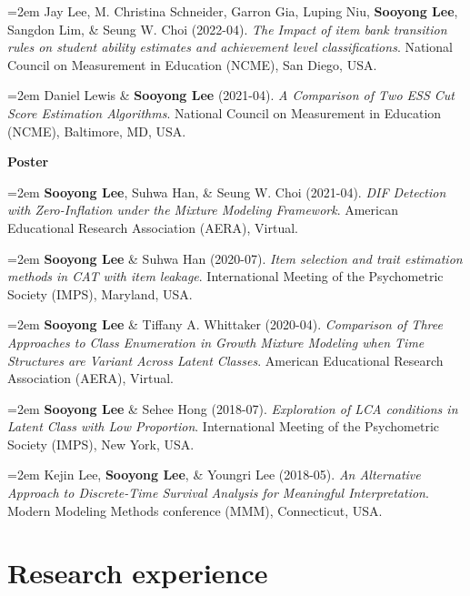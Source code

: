 \documentclass[11pt,letterpaper,]{awesome-me}
\begin{document}
\hangindent=2em  Jay Lee, M. Christina Schneider, Garron
Gia, Luping Niu, \textbf{Sooyong Lee}, Sangdon Lim, \& Seung W. Choi
(2022-04). \emph{The Impact of item bank transition rules on student
ability estimates and achievement level classifications}. National
Council on Measurement in Education (NCME), San Diego, USA.

\hangindent=2em  Daniel Lewis \& \textbf{Sooyong Lee}
(2021-04). \emph{A Comparison of Two ESS Cut Score Estimation
Algorithms}. National Council on Measurement in Education (NCME),
Baltimore, MD, USA.

\setlength{\leftskip}{0cm}

\textbf{Poster}

\setlength{\leftskip}{0.5cm}

\hangindent=2em  \textbf{Sooyong Lee}, Suhwa Han, \& Seung
W. Choi (2021-04). \emph{DIF Detection with Zero-Inflation under the
Mixture Modeling Framework}. American Educational Research Association
(AERA), Virtual.

\hangindent=2em  \textbf{Sooyong Lee} \& Suhwa Han
(2020-07). \emph{Item selection and trait estimation methods in CAT with
item leakage}. International Meeting of the Psychometric Society (IMPS),
Maryland, USA.

\hangindent=2em  \textbf{Sooyong Lee} \& Tiffany A.
Whittaker (2020-04). \emph{Comparison of Three Approaches to Class
Enumeration in Growth Mixture Modeling when Time Structures are Variant
Across Latent Classes}. American Educational Research Association
(AERA), Virtual.

\hangindent=2em  \textbf{Sooyong Lee} \& Sehee Hong
(2018-07). \emph{Exploration of LCA conditions in Latent Class with Low
Proportion}. International Meeting of the Psychometric Society (IMPS),
New York, USA.

\hangindent=2em  Kejin Lee, \textbf{Sooyong Lee}, \& Youngri
Lee (2018-05). \emph{An Alternative Approach to Discrete-Time Survival
Analysis for Meaningful Interpretation}. Modern Modeling Methods
conference (MMM), Connecticut, USA.

\setlength{\leftskip}{0cm}

\vspace{0em}

\hypertarget{research-experience}{%
\section{Research experience}\label{research-experience}}
\end{document}
